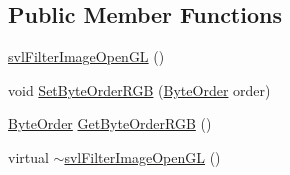 \subsection*{Public Member Functions}
\begin{DoxyCompactItemize}
\item 
\hyperlink{classsvl_filter_image_open_g_l_a8b772ba681346f079117e661f26551b7}{svl\-Filter\-Image\-Open\-G\-L} ()
\item 
void \hyperlink{classsvl_filter_image_open_g_l_aa16192e2c1aa0064d7e11494e3036b57}{Set\-Byte\-Order\-R\-G\-B} (\hyperlink{classsvl_filter_image_open_g_l_aebab8852e9b2fd8bc2fb69c7ce788d3f}{Byte\-Order} order)
\item 
\hyperlink{classsvl_filter_image_open_g_l_aebab8852e9b2fd8bc2fb69c7ce788d3f}{Byte\-Order} \hyperlink{classsvl_filter_image_open_g_l_a4daa667fb422ccd3ce8bcc77055fe3f7}{Get\-Byte\-Order\-R\-G\-B} ()
\item 
virtual \hyperlink{classsvl_filter_image_open_g_l_aa0189005553588af884ee62ab9aa3c74}{$\sim$svl\-Filter\-Image\-Open\-G\-L} ()
\end{DoxyCompactItemize}
